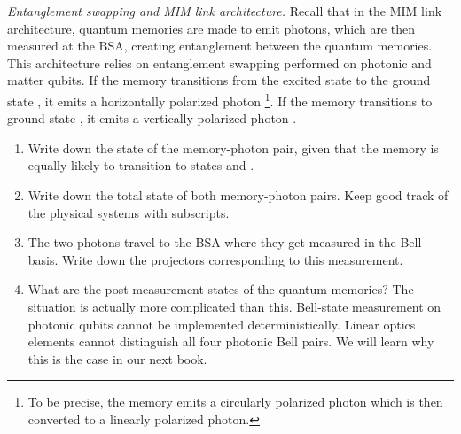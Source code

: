 \begin{exercise}
\emph{Entanglement swapping and MIM link architecture.}
Recall that in the MIM link architecture, quantum memories are made to emit photons, which are then measured at the BSA, creating entanglement between the quantum memories.
This architecture relies on entanglement swapping performed on photonic and matter qubits.
If the memory transitions from the excited state  to the ground state , it emits a horizontally polarized photon \footnote{To be precise, the memory emits a circularly polarized photon which is then converted to a linearly polarized photon.}.
If the memory transitions to ground state , it emits a vertically polarized photon .
\begin{enumerate}[label=(\alph*)]
    \item Write down the state of the memory-photon pair, given that the memory is equally likely to transition to states  and .
    \item Write down the total state of both memory-photon pairs. Keep good track of the physical systems with subscripts.
    \item The two photons travel to the BSA where they get measured in the Bell basis. Write down the projectors corresponding to this measurement.
    \item What are the post-measurement states of the quantum memories?
    \noindent The situation is actually more complicated than this. Bell-state measurement on photonic qubits cannot be implemented deterministically. Linear optics elements cannot distinguish all four photonic Bell pairs. We will learn why this is the case in our next book.
\end{enumerate}
\end{exercise}
